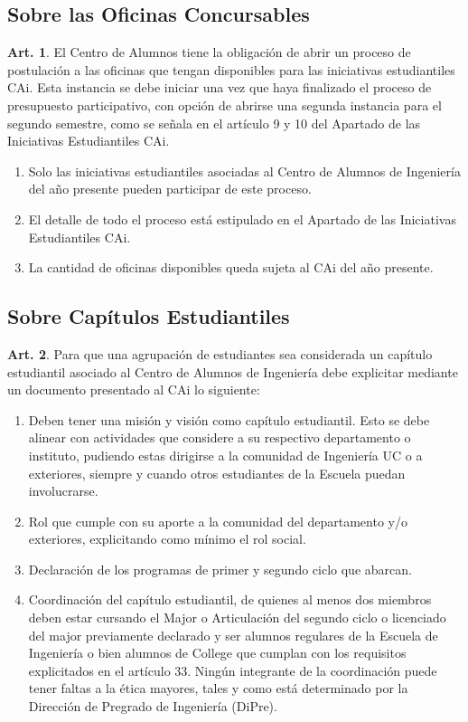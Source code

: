 \documentclass[letterpaper,11pt]{article}
\theoremstyle{definition}%
\newtheorem{art}{Art.} %
\begin{document}
\subsection*{Sobre las Oficinas Concursables}

\begin{art}
	El Centro de Alumnos tiene la obligación de abrir un proceso de postulación a las oficinas que tengan disponibles para las iniciativas estudiantiles CAi. Esta instancia se debe iniciar una vez que haya finalizado el proceso de presupuesto participativo, con opción de abrirse una segunda instancia para el segundo semestre, como se señala en el artículo 9 y 10 del Apartado de las Iniciativas Estudiantiles CAi.
	\begin{enumerate}
		\item Solo las iniciativas estudiantiles asociadas al Centro de Alumnos de Ingeniería del año presente pueden participar de este proceso.
		\item El detalle de todo el proceso está estipulado en el Apartado de las Iniciativas Estudiantiles CAi.
		\item La cantidad de oficinas disponibles queda sujeta al CAi del año presente.
	\end{enumerate}
\end{art}

\subsection*{Sobre Capítulos Estudiantiles}

\begin{art}
	Para que una agrupación de estudiantes sea considerada un capítulo estudiantil asociado al Centro de Alumnos de Ingeniería debe explicitar mediante un documento presentado al CAi lo siguiente:

	\begin{enumerate}
		\item Deben tener una misión y visión como capítulo estudiantil. Esto se debe alinear con actividades que considere a su respectivo departamento o instituto, pudiendo estas dirigirse a la comunidad de Ingeniería UC o a exteriores, siempre y cuando otros estudiantes de la Escuela puedan involucrarse.
		\item Rol que cumple con su aporte a la comunidad del departamento y/o exteriores, explicitando como mínimo el rol social.
		\item Declaración de los programas de primer y segundo ciclo que abarcan.
		\item Coordinación del capítulo estudiantil, de quienes al menos dos miembros deben estar cursando el Major o Articulación del segundo ciclo o licenciado del major previamente declarado y ser alumnos regulares de la Escuela de Ingeniería o bien alumnos de College que cumplan con los requisitos explicitados en el artículo 33. Ningún integrante de la coordinación puede tener faltas a la ética mayores, tales y como está determinado por la Dirección de Pregrado de Ingeniería (DiPre).
	\end{enumerate}
\end{art}
\end{document}
